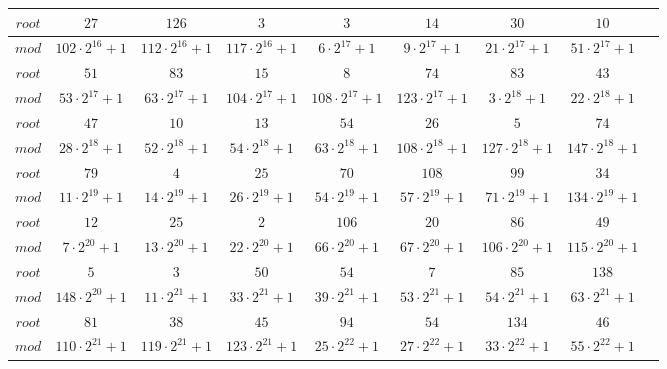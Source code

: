 \documentclass{article}
\begin{document}
\begin{tabular}{|c|c|c|c|c|c|c|c|c|}
$root$& $27$& $126$& $3$& $3$& $14$& $30$& $10$\\
\hline


$mod$& $102\cdot 2^{16}+1$& $112\cdot 2^{16}+1$& $117\cdot 2^{16}+1$& $6\cdot 2^{17}+1$& $9\cdot 2^{17}+1$& $21\cdot 2^{17}+1$& $51\cdot 2^{17}+1$\\
\hline

$root$& $51$& $83$& $15$& $8$& $74$& $83$& $43$\\
\hline


$mod$& $53\cdot 2^{17}+1$& $63\cdot 2^{17}+1$& $104\cdot 2^{17}+1$& $108\cdot 2^{17}+1$& $123\cdot 2^{17}+1$& $3\cdot 2^{18}+1$& $22\cdot 2^{18}+1$\\
\hline

$root$& $47$& $10$& $13$& $54$& $26$& $5$& $74$\\
\hline


$mod$& $28\cdot 2^{18}+1$& $52\cdot 2^{18}+1$& $54\cdot 2^{18}+1$& $63\cdot 2^{18}+1$& $108\cdot 2^{18}+1$& $127\cdot 2^{18}+1$& $147\cdot 2^{18}+1$\\
\hline

$root$& $79$& $4$& $25$& $70$& $108$& $99$& $34$\\
\hline


$mod$& $11\cdot 2^{19}+1$& $14\cdot 2^{19}+1$& $26\cdot 2^{19}+1$& $54\cdot 2^{19}+1$& $57\cdot 2^{19}+1$& $71\cdot 2^{19}+1$& $134\cdot 2^{19}+1$\\
\hline

$root$& $12$& $25$& $2$& $106$& $20$& $86$& $49$\\
\hline


$mod$& $7\cdot 2^{20}+1$& $13\cdot 2^{20}+1$& $22\cdot 2^{20}+1$& $66\cdot 2^{20}+1$& $67\cdot 2^{20}+1$& $106\cdot 2^{20}+1$& $115\cdot 2^{20}+1$\\
\hline

$root$& $5$& $3$& $50$& $54$& $7$& $85$& $138$\\
\hline


$mod$& $148\cdot 2^{20}+1$& $11\cdot 2^{21}+1$& $33\cdot 2^{21}+1$& $39\cdot 2^{21}+1$& $53\cdot 2^{21}+1$& $54\cdot 2^{21}+1$& $63\cdot 2^{21}+1$\\
\hline

$root$& $81$& $38$& $45$& $94$& $54$& $134$& $46$\\
\hline


$mod$& $110\cdot 2^{21}+1$& $119\cdot 2^{21}+1$& $123\cdot 2^{21}+1$& $25\cdot 2^{22}+1$& $27\cdot 2^{22}+1$& $33\cdot 2^{22}+1$& $55\cdot 2^{22}+1$\\
\hline


\end{tabular}
\end{document}
